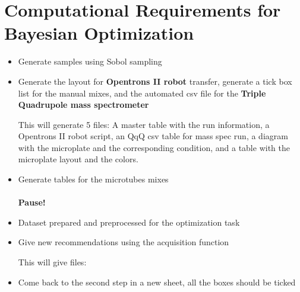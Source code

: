 \documentclass{article}
\newcommand{\bigbox}{\raisebox{\depth}{\scalebox{1.5}{$\square$}}}
\begin{document}
\noindent{}

\noindent{}
\hspace{1cm}  %

\section{Computational Requirements for Bayesian Optimization}
\begin{itemize}
\item[\bigbox] {Generate samples using Sobol sampling}
\item[\bigbox] {Generate the layout for \textbf{Opentrons II robot} transfer, generate a tick box list for the manual mixes, and the automated csv file for the \textbf{Triple Quadrupole mass spectrometer}}

This will generate 5 files: A master table with the run information, a Opentrons II robot script, an QqQ csv table for mass spec run, a diagram with the microplate and the corresponding condition, and a table with the microplate layout and the colors.

\item[\bigbox] {Generate tables for the microtubes mixes}
\\\\
\textbf{Pause!}

\item[\bigbox] {Dataset prepared and preprocessed for the optimization task}
\item[\bigbox] {Give new recommendations using the acquisition function}

This will give files:
\item[\bigbox] {Come back to the second step in a new sheet, all the boxes should be ticked}
\end{itemize}
\end{document}
